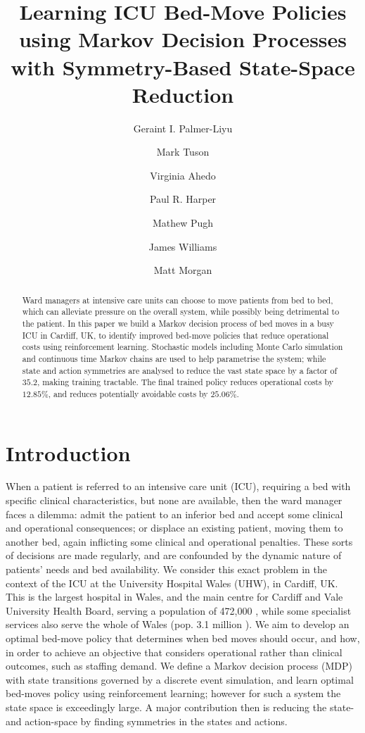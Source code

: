 \documentclass{article}
\title{\bf Learning ICU Bed-Move Policies using Markov Decision Processes with Symmetry-Based State-Space Reduction}
\author{Geraint I. Palmer-Liyu \and Mark Tuson \and Virginia Ahedo \and Paul R. Harper \and Mathew Pugh \and James Williams \and Matt Morgan}
\date{}
\begin{document}
\maketitle

\begin{abstract}
Ward managers at intensive care units can choose to move patients from bed to
bed, which can alleviate pressure on the overall system, while possibly being
detrimental to the patient.
In this paper we build a Markov decision process of bed moves in a busy ICU in
Cardiff, UK, to identify improved bed-move policies that reduce operational
costs using reinforcement learning.
Stochastic models including Monte Carlo simulation and continuous time Markov
chains are used to help parametrise the system; while state and action
symmetries are analysed to reduce the vast state space by a factor of $35.2$,
making training tractable.
The final trained policy reduces operational costs by $12.85\%$, and reduces
potentially avoidable costs by $25.06\%$.
\end{abstract}


\section{Introduction}\label{sec:intro_background}
When a patient is referred to an intensive care unit (ICU), requiring a bed with
specific clinical characteristics, but none are available, then the ward manager
faces a dilemma: admit the patient to an inferior bed and accept some clinical
and operational consequences; or displace an existing patient, moving them to
another bed, again inflicting some clinical and operational penalties.
These sorts of decisions are made regularly, and are confounded by the dynamic
nature of patients' needs and bed availability.
We consider this exact problem in the context of the ICU at the University
Hospital Wales (UHW), in Cardiff, UK.
This is the largest hospital in Wales, and the main centre for Cardiff and Vale
University Health Board, serving a population of 472,000
\cite{cavuhb_structure}, while some specialist services also serve the whole of
Wales (pop. 3.1 million \cite{statswales_pop}).
We aim to develop an optimal bed-move policy that determines when bed moves
should occur, and how, in order to achieve an objective that considers
operational rather than clinical outcomes, such as staffing demand.
We define a Markov decision process (MDP) with state transitions governed by a
discrete event simulation, and learn optimal bed-moves policy using
reinforcement learning; however for such a system the state space is exceedingly
large. A major contribution then is reducing the state- and action-space by
finding symmetries in the states and actions.
\end{document}
